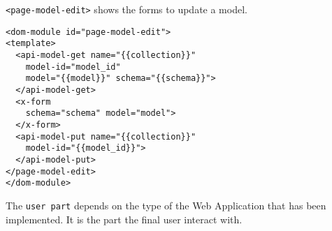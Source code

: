 \texttt{<page-model-edit>} shows the forms to update a model.

\begin{lstlisting}[language=HTML5]
<dom-module id="page-model-edit">
<template>
  <api-model-get name="{{collection}}"
    model-id="model_id"
    model="{{model}}" schema="{{schema}}">
  </api-model-get>
  <x-form 
    schema="schema" model="model">
  </x-form>
  <api-model-put name="{{collection}}"
    model-id="{{model_id}}">
  </api-model-put>
</page-model-edit>
</dom-module>
\end{lstlisting}

The \texttt{user part} depends on the type of the Web Application that has been implemented.
It is the part the final user interact with.


